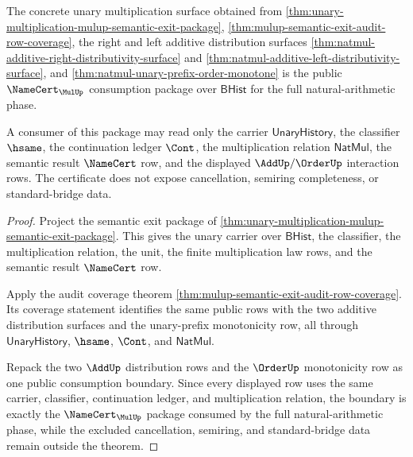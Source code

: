 \begin{theorem}
\label{thm:mulup-public-semantic-exit-certificate}
The concrete unary multiplication surface obtained from
\autoref{thm:unary-multiplication-mulup-semantic-exit-package},
\autoref{thm:mulup-semantic-exit-audit-row-coverage}, the right and left
additive distribution surfaces
\autoref{thm:natmul-additive-right-distributivity-surface} and
\autoref{thm:natmul-additive-left-distributivity-surface}, and
\autoref{thm:natmul-unary-prefix-order-monotone} is the public
$\NameCert_{\MulUp}$ consumption package over $\mathsf{BHist}$ for the full
natural-arithmetic phase.

A consumer of this package may read only the carrier
$\mathsf{UnaryHistory}$, the classifier $\hsame$, the continuation ledger
$\Cont$, the multiplication relation $\mathsf{NatMul}$, the semantic result
$\NameCert$ row, and the displayed $\AddUp/\OrderUp$ interaction rows. The
certificate does not expose cancellation, semiring completeness, or
standard-bridge data.
\end{theorem}
\begin{proof}
Project the semantic exit package of
\autoref{thm:unary-multiplication-mulup-semantic-exit-package}. This gives the
unary carrier over $\mathsf{BHist}$, the classifier, the multiplication
relation, the unit, the finite multiplication law rows, and the semantic result
$\NameCert$ row.

Apply the audit coverage theorem
\autoref{thm:mulup-semantic-exit-audit-row-coverage}. Its coverage statement
identifies the same public rows with the two additive distribution surfaces and
the unary-prefix monotonicity row, all through $\mathsf{UnaryHistory}$,
$\hsame$, $\Cont$, and $\mathsf{NatMul}$.

Repack the two $\AddUp$ distribution rows and the $\OrderUp$ monotonicity row
as one public consumption boundary. Since every displayed row uses the same
carrier, classifier, continuation ledger, and multiplication relation, the
boundary is exactly the $\NameCert_{\MulUp}$ package consumed by the full
natural-arithmetic phase, while the excluded cancellation, semiring, and
standard-bridge data remain outside the theorem.
\end{proof}

